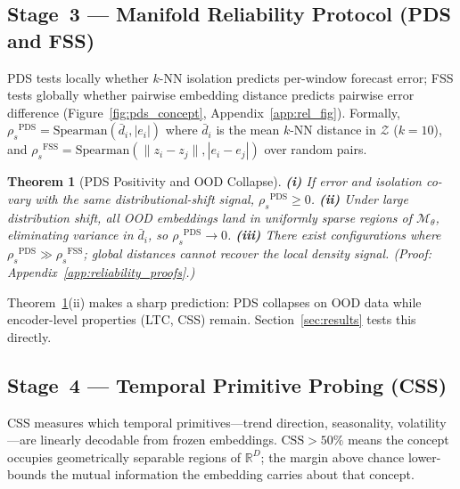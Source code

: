 \documentclass[10pt]{article}
\newtheorem{theorem}{Theorem}[section]
\theoremstyle{definition}
\theoremstyle{remark}
\newcommand{\R}{\mathbb{R}}
\newcommand{\Zset}{\mathcal{Z}}
\newcommand{\trm}{\mathcal{M}_\theta}
\newcommand{\pds}{\ensuremath{\mathrm{PDS}}}
\newcommand{\fss}{\ensuremath{\mathrm{FSS}}}
\newcommand{\css}{\ensuremath{\mathrm{CSS}}}
\newcommand{\rspear}{\ensuremath{\rho_s}}
\begin{document}
\subsection{Stage~3 --- Manifold Reliability Protocol (PDS and FSS)}
\label{sec:reliability}

PDS tests locally whether $k$-NN isolation predicts per-window forecast error;
FSS tests globally whether pairwise embedding distance predicts pairwise error
difference (Figure~\ref{fig:pds_concept}, Appendix~\ref{app:rel_fig}).
Formally, $\rspear^{\pds} = \mathrm{Spearman}(\bar{d}_i, |e_i|)$ where
$\bar{d}_i$ is the mean $k$-NN distance in $\Zset$ ($k{=}10$), and
$\rspear^{\fss} = \mathrm{Spearman}(\|z_i{-}z_j\|, |e_i{-}e_j|)$ over
random pairs.

\begin{theorem}[PDS Positivity and OOD Collapse]
\label{thm:pds_main}
\textbf{(i)} If error and isolation co-vary with the same distributional-shift
signal, $\rspear^{\pds} \geq 0$.
\textbf{(ii)} Under large distribution shift, all OOD embeddings land in
uniformly sparse regions of $\trm$, eliminating variance in $\bar{d}_i$, so
$\rspear^{\pds} \to 0$.
\textbf{(iii)} There exist configurations where $\rspear^{\pds} \gg \rspear^{\fss}$;
global distances cannot recover the local density signal.
\emph{(Proof: Appendix~\ref{app:reliability_proofs}.)}
\end{theorem}

Theorem~\ref{thm:pds_main}(ii) makes a sharp prediction: PDS collapses on OOD
data while encoder-level properties (LTC, CSS) remain.
Section~\ref{sec:results} tests this directly.

\subsection{Stage~4 --- Temporal Primitive Probing (CSS)}
\label{sec:css}

CSS measures which temporal primitives---trend direction, seasonality,
volatility---are linearly decodable from frozen embeddings.
$\css{>}50\%$ means the concept occupies geometrically separable regions of
$\R^D$; the margin above chance lower-bounds the mutual information the
embedding carries about that concept.
\end{document}
